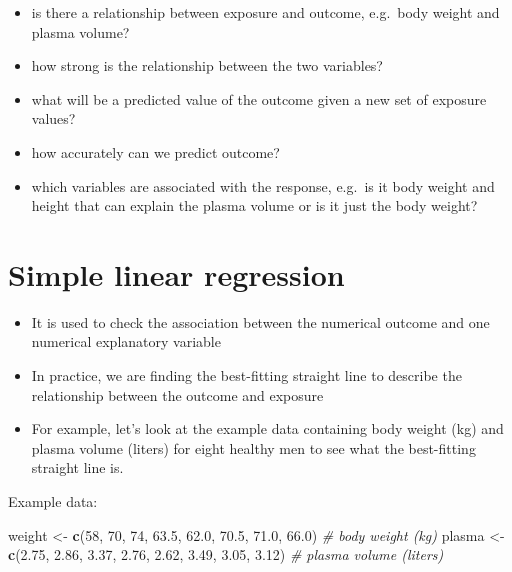 \documentclass[
]{book}
\newenvironment{Shaded}{\begin{snugshade}}{\end{snugshade}}
\newcommand{\CommentTok}[1]{\textcolor[rgb]{0.56,0.35,0.01}{\textit{#1}}}
\newcommand{\DecValTok}[1]{\textcolor[rgb]{0.00,0.00,0.81}{#1}}
\newcommand{\FloatTok}[1]{\textcolor[rgb]{0.00,0.00,0.81}{#1}}
\newcommand{\KeywordTok}[1]{\textcolor[rgb]{0.13,0.29,0.53}{\textbf{#1}}}
\newcommand{\NormalTok}[1]{#1}
\newcommand{\StringTok}[1]{\textcolor[rgb]{0.31,0.60,0.02}{#1}}
\providecommand{\tightlist}{%
  \setlength{\itemsep}{0pt}\setlength{\parskip}{0pt}}
\theoremstyle{definition}
\theoremstyle{definition}
\theoremstyle{definition}
\theoremstyle{remark}
\begin{document}
\begin{itemize}
\tightlist
\item
  is there a relationship between exposure and outcome, e.g.~body weight and plasma volume?
\item
  how strong is the relationship between the two variables?
\item
  what will be a predicted value of the outcome given a new set of exposure values?
\item
  how accurately can we predict outcome?
\item
  which variables are associated with the response, e.g.~is it body weight and height that can explain the plasma volume or is it just the body weight?
\end{itemize}

\hypertarget{simple-linear-regression}{%
\section{Simple linear regression}\label{simple-linear-regression}}

\begin{itemize}
\tightlist
\item
  It is used to check the association between the numerical outcome and one numerical explanatory variable
\item
  In practice, we are finding the best-fitting straight line to describe the relationship between the outcome and exposure
\item
  For example, let's look at the example data containing body weight (kg) and plasma volume (liters) for eight healthy men to see what the best-fitting straight line is.
\end{itemize}

Example data:

\begin{Shaded}
\begin{Highlighting}[]
\NormalTok{weight \textless{}{-}}\StringTok{ }\KeywordTok{c}\NormalTok{(}\DecValTok{58}\NormalTok{, }\DecValTok{70}\NormalTok{, }\DecValTok{74}\NormalTok{, }\FloatTok{63.5}\NormalTok{, }\FloatTok{62.0}\NormalTok{, }\FloatTok{70.5}\NormalTok{, }\FloatTok{71.0}\NormalTok{, }\FloatTok{66.0}\NormalTok{) }\CommentTok{\# body weight (kg)}
\NormalTok{plasma \textless{}{-}}\StringTok{ }\KeywordTok{c}\NormalTok{(}\FloatTok{2.75}\NormalTok{, }\FloatTok{2.86}\NormalTok{, }\FloatTok{3.37}\NormalTok{, }\FloatTok{2.76}\NormalTok{, }\FloatTok{2.62}\NormalTok{, }\FloatTok{3.49}\NormalTok{, }\FloatTok{3.05}\NormalTok{, }\FloatTok{3.12}\NormalTok{) }\CommentTok{\# plasma volume (liters)}
\end{Highlighting}
\end{Shaded}
\end{document}
